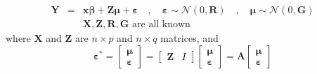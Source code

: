 \documentclass{article}
\begin{document}
\begin{eqnarray*}
\mathbf{Y} &=&\mathbf{x\beta }+\mathbf{Z\mu }+\mathbf{\varepsilon \quad
,\quad \varepsilon }\sim \mathcal{N}\left( 0,\mathbf{R}\right) \mathbf{\quad
,\quad \mu }\sim \mathcal{N}\left( 0,\mathbf{G}\right)  \\
&&\mathbf{X,Z,R,G}\text{ are all known}
\end{eqnarray*}%
where $\mathbf{X}$ and $\mathbf{Z}$ are $n\times p$ and $n\times q$
matrices, and%
\begin{equation*}
\mathbf{\varepsilon }^{\ast }=\left[ 
\begin{array}{c}
\mathbf{\mu } \\ 
\mathbf{\varepsilon }%
\end{array}%
\right] =\left[ 
\begin{array}{cc}
\mathbf{Z} & I%
\end{array}%
\right] \left[ 
\begin{array}{c}
\mathbf{\mu } \\ 
\mathbf{\varepsilon }%
\end{array}%
\right] =\mathbf{A}\left[ 
\begin{array}{c}
\mathbf{\mu } \\ 
\mathbf{\varepsilon }%
\end{array}%
\right] 
\end{equation*}

\bigskip
\end{document}
